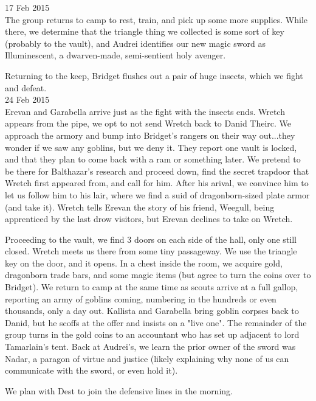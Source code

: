 \documentclass[letterpaper]{article}
\begin{document}
17 Feb 2015\\
The group returns to camp to rest, train, and pick up some more supplies. While there, we determine that the triangle thing we collected is some sort of key (probably to the vault), and Audrei identifies our new magic sword as Illuminescent, a dwarven-made, semi-sentient holy avenger.

Returning to the keep, Bridget flushes out a pair of huge insects, which we fight and defeat.\\

24 Feb 2015\\
Erevan and Garabella arrive just as the fight with the insects ends. Wretch appears from the pipe, we opt to not send Wretch back to Danid Theirc. We approach the armory and bump into Bridget's rangers on their way out...they wonder if we saw any goblins, but we deny it. They report one vault is locked, and that they plan to come back with a ram or something later. We pretend to be there for Balthazar's research and proceed down, find the secret trapdoor that Wretch first appeared from, and call for him. After his arival, we convince him to let us follow him to his lair, where we find a suid of dragonborn-sized plate armor (and take it). Wretch tells Erevan the story of his friend, Weegull, being apprenticed by the last drow visitors, but Erevan declines to take on Wretch.

Proceeding to the vault, we find 3 doors on each side of the hall, only one still closed. Wretch meets us there from some tiny passageway. We use the triangle key on the door, and it opens. In a chest inside the room, we acquire gold, dragonborn trade bars, and some magic items (but agree to turn the coins over to Bridget). We return to camp at the same time as scouts arrive at a full gallop, reporting an army of goblins coming, numbering in the hundreds or even thousands, only a day out. Kallista and Garabella bring goblin corpses back to Danid, but he scoffs at the offer and insists on a "live one". The remainder of the group turns in the gold coins to an accountant who has set up adjacent to lord Tamarlain's tent. Back at Audrei's, we learn the prior owner of the sword was Nadar, a paragon of virtue and justice (likely explaining why none of us can communicate with the sword, or even hold it). 

We plan with Dest to join the defensive lines in the morning.
\end{document}
